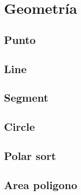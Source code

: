 \newpage
\section{Geometr\'ia}

\subsection{Punto}


\subsection{Line}


\subsection{Segment}


\subsection{Circle}


\subsection{Polar sort}


\subsection{Area poligono}

\newpage